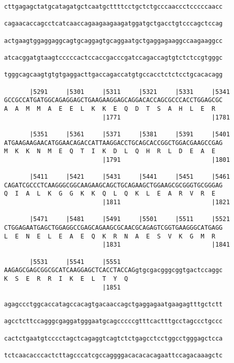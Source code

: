 \documentclass{article}
\begin{document}
\begin{Verbatim}
cttgagagctatgcatagatgctcaatgcttttcctgctctgcccaaccctcccccaacc

cagaacaccagcctcatcaaccagaagaagaagatggatgctgacctgtcccagctccag

actgaagtggaggaggcagtgcaggagtgcaggaatgctgaggagaaggccaagaaggcc

atcacggatgtaagtcccccactccaccgacccgatccagaccagtgtctctccgtgggc

tgggcagcaagtgtgtgaggacttgaccagaccatgtgccacctctctcctgcacacagg

       |5291     |5301     |5311     |5321     |5331     |5341
GCCGCCATGATGGCAGAGGAGCTGAAGAAGGAGCAGGACACCAGCGCCCACCTGGAGCGC
A  A  M  M  A  E  E  L  K  K  E  Q  D  T  S  A  H  L  E  R  
                           |1771                         |1781
  
       |5351     |5361     |5371     |5381     |5391     |5401
ATGAAGAAGAACATGGAACAGACCATTAAGGACCTGCAGCACCGGCTGGACGAAGCCGAG
M  K  K  N  M  E  Q  T  I  K  D  L  Q  H  R  L  D  E  A  E  
                           |1791                         |1801
  
       |5411     |5421     |5431     |5441     |5451     |5461
CAGATCGCCCTCAAGGGCGGCAAGAAGCAGCTGCAGAAGCTGGAAGCGCGGGTGCGGGAG
Q  I  A  L  K  G  G  K  K  Q  L  Q  K  L  E  A  R  V  R  E  
                           |1811                         |1821
  
       |5471     |5481     |5491     |5501     |5511     |5521
CTGGAGAATGAGCTGGAGGCCGAGCAGAAGCGCAACGCAGAGTCGGTGAAGGGCATGAGG
L  E  N  E  L  E  A  E  Q  K  R  N  A  E  S  V  K  G  M  R  
                           |1831                         |1841
  
       |5531     |5541     |5551                            
AAGAGCGAGCGGCGCATCAAGGAGCTCACCTACCAGgtgcgacgggcggtgactccaggc
K  S  E  R  R  I  K  E  L  T  Y  Q                          
                           |1851                            
  
agagccctggcaccatagccacagtgacaaccagctgaggagaatgaagagtttgctctt
                                                            
agcctcttccagggcgaggatgggaatgcagcccccgtttcactttgcctagccctgccc
                                                            
cactctgaatgtcccctagctcagaggtcagtctctgagcctcctggcctgggagctcca
                                                            
tctcaacacccactcttagcccatcgccaggggacacacacagaattccagacaaagctc
                                                            

\end{Verbatim}
\end{document}
